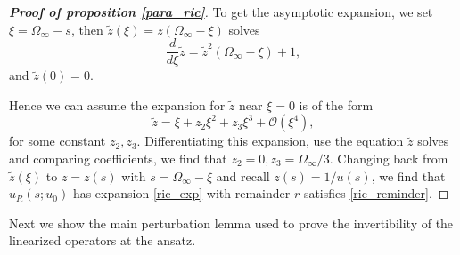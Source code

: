 \documentclass[letterpaper,11pt]{article}
\newcommand{\rmO}{\mathcal{O}}
\numberwithin{equation}{section}
\theoremstyle{plain}
\begin{document}
\begin{proof}[\textbf{Proof of proposition \ref{para_ric}}]
To get the asymptotic expansion, we set $\xi = \Omega_\infty-s$, then $\tilde{z}(\xi)=z(\Omega_\infty-\xi)$ solves
\[
\frac{d}{d\xi} \tilde{z} = \tilde{z}^2(\Omega_\infty-\xi)+1,
\]
and $\tilde{z}(0) = 0$.

Hence we can assume the expansion for $\tilde{z}$ near $\xi=0$ is of the form
\[
\tilde{z} = \xi + z_2\xi^2+z_3\xi^3 + \rmO(\xi^4),
\]
for some constant $z_2,z_3$. Differentiating this expansion, use the equation $\tilde{z}$ solves and comparing coefficients, we find that $z_2 = 0, z_3 = \Omega_\infty/3$.  Changing back from $\tilde{z}(\xi)$ to $z=z(s)$ with $s = \Omega_\infty-\xi$ and recall $z(s) = 1/u(s)$, we find that $u_R(s;u_0)$ has expansion \eqref{ric_exp} with remainder $r$ satisfies \eqref{ric_reminder}.


\end{proof}

Next we show the main perturbation lemma used to prove the invertibility of the linearized operators at the ansatz.
\end{document}
